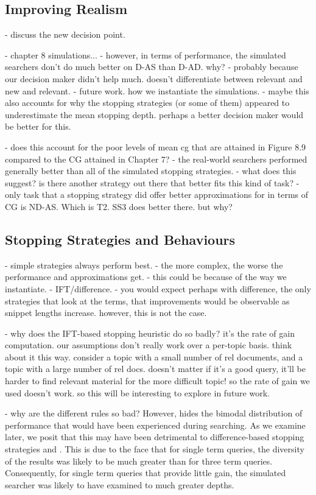 \subsection{Improving Realism}

- discuss the new decision point.

- chapter 8 simulations...
- however, in terms of performance, the simulated searchers don't do much better on D-AS than D-AD. why?
    - probably because our decision maker didn't help much. doesn't differentiate between relevant and new and relevant.
    - future work. how we instantiate the simulations.
    - maybe this also accounts for why the stopping strategies (or some of them) appeared to underestimate the mean stopping depth. perhaps a better decision maker would be better for this.
    
- does this account for the poor levels of mean cg that are attained in Figure 8.9 compared to the CG attained in Chapter 7?
    - the real-world searchers performed generally better than all of the simulated stopping strategies.
        - what does this suggest? is there another strategy out there that better fits this kind of task?
        - only task that a stopping strategy did offer better approximations for in terms of CG is ND-AS. Which is T2. SS3 does better there. but why?

\subsection{Stopping Strategies and Behaviours}

- simple strategies always perform best.
- the more complex, the worse the performance and approximations get.
    - this could be because of the way we instantiate.
    - IFT/difference.
        - you would expect perhaps with difference, the only strategies that look at the terms, that improvements would be observable as snippet lengths increase. however, this is not the case.

- why does the IFT-based stopping heuristic do so badly? it's the rate of gain computation. our assumptions don't really work over a per-topic basis. think about it this way. consider a topic with a small number of rel documents, and a topic with a large number of rel docs. doesn't matter if it's a good query, it'll be harder to find relevant material for the more difficult topic! so the rate of gain we used doesn't work. so this will be interesting to explore in future work.

- why are the different rules so bad? However,  hides the bimodal distribution of performance that would have been experienced during searching. As we examine later, we posit that this may have been detrimental to difference-based stopping strategies  and . This is due to the face that for single term queries, the diversity of the results was likely to be much greater than for three term queries. Consequently, for single term queries that provide little gain, the simulated searcher was likely to have examined to much greater depths.

